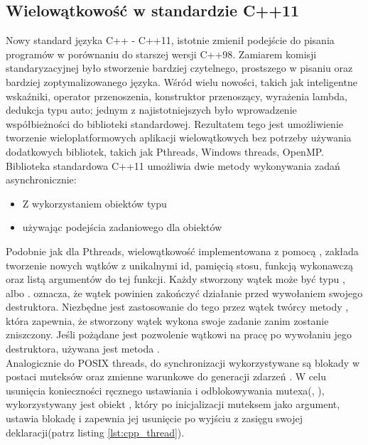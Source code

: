 \documentclass[document.tex]{subfiles}
\begin{document}
\subsection{Wielowątkowość w standardzie C++11}
\indent Nowy standard języka C++ - C++11, istotnie zmienił podejście do pisania programów w porównaniu do starszej wersji C++98. Zamiarem komisji standaryzacyjnej było stworzenie bardziej czytelnego, prostszego w pisaniu oraz bardziej zoptymalizowanego języka.
Wśród wielu nowości, takich jak inteligentne wskaźniki, operator przenoszenia, konstruktor przenoszący, wyrażenia lambda, dedukcja typu auto; jednym z najistotniejszych było wprowadzenie współbieżności do biblioteki standardowej.
Rezultatem tego jest umożliwienie tworzenie wieloplatformowych aplikacji 
wielowątkowych bez potrzeby używania dodatkowych bibliotek, takich jak Pthreads,
Windows threads, OpenMP.\cite{C++_Meyers}\cite{C++_Stroustrup}
\\
\indent Biblioteka standardowa C++11 umożliwia dwie metody wykonywania
zadań asynchronicznie\cite{C++_Meyers}\cite{C++11_iso}:
\begin{itemize}
\item Z wykorzystaniem obiektów typu 
\item używając podejścia zadaniowego dla obiektów 
\end{itemize}
\indent Podobnie jak dla Pthreads, wielowątkowość implementowana z pomocą
, zakłada tworzenie nowych wątków z unikalnymi id, 
pamięcią stosu, funkcją wykonawczą oraz listą argumentów do tej funkcji.
Każdy stworzony wątek może być typu , albo .
 oznacza, że wątek powinien zakończyć działanie przed
wywołaniem swojego destruktora. Niezbędne jest zastosowanie do tego 
przez wątek twórcy metody , która zapewnia, że stworzony
wątek wykona swoje zadanie zanim zostanie zniszczony. Jeśli pożądane
jest pozwolenie wątkowi na pracę po wywołaniu jego destruktora, 
używana jest metoda .\cite{C++11_iso}\cite{C++_Stroustrup}
\\
\indent Analogicznie do POSIX threads, do synchronizacji wykorzystywane są blokady w postaci muteksów   oraz zmienne warunkowe do generacji zdarzeń 
. W celu usunięcia konieczności ręcznego
ustawiania i odblokowywania mutexa(, ),
wykorzystywany jest obiekt , który po inicjalizacji
muteksem jako argument, ustawia blokadę i zapewnia jej usunięcie po wyjściu
z zasięgu swojej deklaracji(patrz listing \ref{lst:cpp_thread}).\cite{C++11_iso}\cite{C++11_tutorial}
\\

\end{document}
